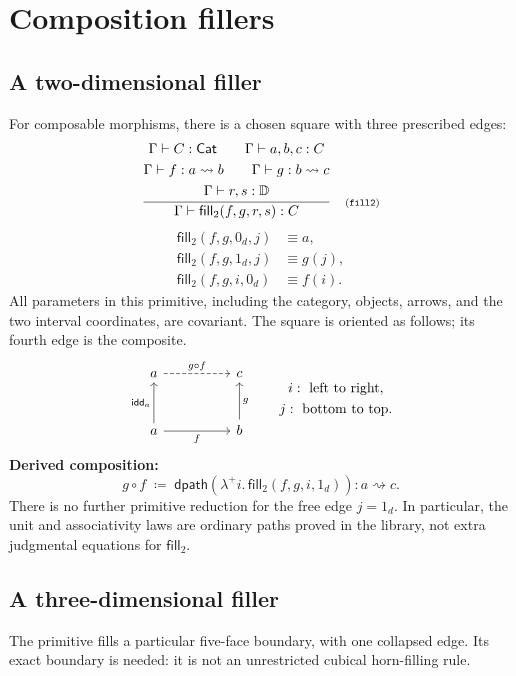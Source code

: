 \documentclass[11pt,a4paper]{article}
\newcommand{\Cat}{\mathsf{Cat}}
\newcommand{\DI}{\mathbb D}
\newcommand{\dl}{0_{\!d}}
\newcommand{\dr}{1_{\!d}}
\newcommand{\dpath}{\mathsf{dpath}}
\newcommand{\idd}{\mathsf{idd}}
\newcommand{\filltwo}{\mathsf{fill}_{2}}
\newcommand{\arr}{\mathrel{\rightsquigarrow}}
\newcommand{\lamplus}[1]{\lambda^{+}#1.\,}
\newcommand{\rulelabel}[1]{\quad\text{\scriptsize(#1)}}
\newcommand{\infer}[3]{\frac{\begin{gathered}#1\end{gathered}}{#2}\rulelabel{#3}}
\newcommand{\code}[1]{\texttt{\detokenize{#1}}}
\newcommand{\blocktitle}[1]{\Needspace{5\baselineskip}\subsection*{#1}}
\begin{document}
\clearpage
\section{Composition fillers}\label{sec:fillers}

\blocktitle{A two-dimensional filler}
For composable morphisms, there is a chosen square with three prescribed
edges:
\[
\infer{\Gamma\vdash C:\Cat\qquad\Gamma\vdash a,b,c:C\\
       \Gamma\vdash f:a\arr b\qquad\Gamma\vdash g:b\arr c\\
       \Gamma\vdash r,s:\DI}
 {\Gamma\vdash\filltwo(f,g,r,s):C}{\code{fill2}}
\]
\begin{align*}
 \filltwo(f,g,\dl,j)&\equiv a,\\
 \filltwo(f,g,\dr,j)&\equiv g(j),\\
 \filltwo(f,g,i,\dl)&\equiv f(i).
\end{align*}
All parameters in this primitive, including the category, objects, arrows,
and the two interval coordinates, are covariant. The square is oriented as
follows; its fourth edge is the composite.
\[
\begin{tikzcd}[row sep=large,column sep=huge]
 a \arrow[r,dashed,"g\circ f"] & c\\
 a \arrow[u,"\idd_a"] \arrow[r,"f"'] & b \arrow[u,"g"']
\end{tikzcd}
\qquad
\begin{gathered}
 i:\ \text{left to right},\\
 j:\ \text{bottom to top}.
\end{gathered}
\]
\textbf{Derived composition:}
\[
 g\circ f\;\coloneqq\;
 \dpath(\lamplus{i}\filltwo(f,g,i,\dr)):a\arr c.
\]
There is no further primitive reduction for the free edge $j=\dr$.
In particular, the unit and associativity laws are ordinary paths proved
in the library, not extra judgmental equations for $\filltwo$.

\blocktitle{A three-dimensional filler}
The primitive \code{fill3} fills a particular five-face boundary, with
one collapsed edge. Its exact boundary is needed: it is not an unrestricted
cubical horn-filling rule.
\end{document}
